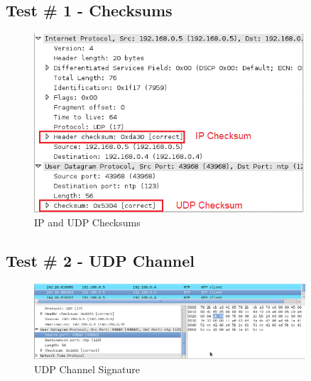 \documentclass[titlepage]{article}
\begin{document}
\subsection{Test \# 1 - Checksums}

\begin{figure}[htb]                                                                       
  \begin{center}
    \includegraphics[width=0.9\textwidth]{Pictures/Checksum.png}
  \end{center}
  \caption{IP and UDP Checksums}
  \label{fig:checksums}
\end{figure}

\clearpage

\subsection{Test \# 2 - UDP Channel}

\begin{figure}[htb]                                                                       
  \begin{center}
    \includegraphics[width=0.9\textwidth]{Pictures/UDP_SIG.png}
  \end{center}
  \caption{UDP Channel Signature}
  \label{fig:udp_sig}
\end{figure}

\clearpage
\end{document}
